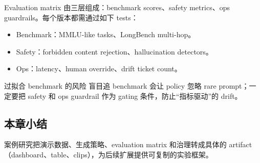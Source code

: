 Evaluation matrix 由三层组成：benchmark scores、safety metrics、ops guardrails。每个版本都需通过如下 tests：
\begin{itemize}
    \item Benchmark：MMLU-like tasks、LongBench multi-hop。
    \item Safety：forbidden content rejection、hallucination detectors。
    \item Ops：latency、human override、drift ticket count。
\end{itemize}

\begin{warningbox}{过拟合 benchmark 的风险}
盲目追 benchmark 会让 policy 忽略 rare prompt；一定要把 safety 和 ops guardrail 作为 gating 条件，防止“指标驱动”的 drift。
\end{warningbox}

\subsection{本章小结}

案例研究把演示数据、生成策略、evaluation matrix 和治理转成具体的 artifact（dashboard、table、clips），为后续扩展提供可复制的实验框架。

